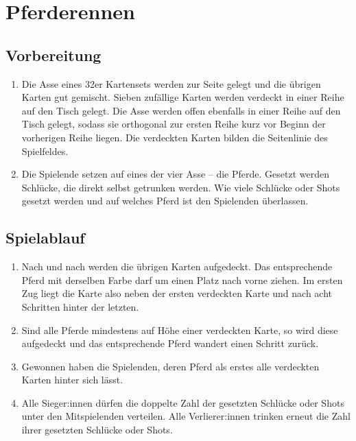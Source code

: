 \chapter{Pferderennen}
\section{Vorbereitung}
\begin{enumerate}[label={(\arabic*)}]    
    \item
    Die Asse eines 32er Kartensets werden zur Seite gelegt und die übrigen Karten gut gemischt.
    Sieben zufällige Karten werden verdeckt in einer Reihe auf den Tisch gelegt.
    Die Asse werden offen ebenfalls in einer Reihe auf den Tisch gelegt, sodass sie orthogonal zur ersten Reihe kurz vor Beginn der vorherigen Reihe liegen.
    Die verdeckten Karten bilden die Seitenlinie des Spielfeldes.

    \item
    Die Spielende setzen auf eines der vier Asse – die \glqq{}Pferde\grqq{}.
    Gesetzt werden Schlücke, die direkt selbst getrunken werden.
    Wie viele Schlücke oder Shots gesetzt werden und auf welches Pferd ist den Spielenden überlassen.
\end{enumerate}

\section{Spielablauf}
\begin{enumerate}[label={(\arabic*)}]
    \item
    Nach und nach werden die übrigen Karten aufgedeckt.
    Das entsprechende Pferd mit derselben Farbe darf um einen Platz nach vorne ziehen.
    Im ersten Zug liegt die Karte also neben der ersten verdeckten Karte und nach acht Schritten hinter der letzten.

    \item
    Sind alle Pferde mindestens auf Höhe einer verdeckten Karte, so wird diese aufgedeckt und das entsprechende Pferd wandert einen Schritt zurück.

    \item
    Gewonnen haben die Spielenden, deren Pferd als erstes alle verdeckten Karten hinter sich lässt.

    \item
    Alle Sieger:innen dürfen die doppelte Zahl der gesetzten Schlücke oder Shots unter den Mitspielenden verteilen.
    Alle Verlierer:innen trinken erneut die Zahl ihrer gesetzten Schlücke oder Shots.
\end{enumerate}
